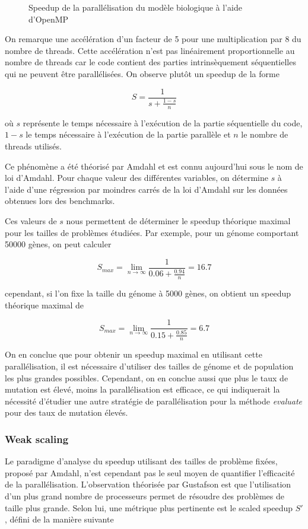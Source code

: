\documentclass[a4paper, 10pt, twoside]{article}
\begin{document}
\begin{figure}[htb]
\begin{minipage}{0.32\textwidth}
	\end{minipage}
	\caption{Speedup de la parallélisation du modèle biologique à l'aide d'OpenMP}
	\label{fig:speedup/omp}
\end{figure}

On remarque une accélération d'un facteur de 5 pour une multiplication par 8 du nombre de threads. Cette accélération n'est pas linéairement proportionnelle au nombre de threads car le code contient des parties intrinsèquement séquentielles qui ne peuvent être parallélisées. On observe plutôt un speedup de la forme

$$ S = \frac{1}{s + \frac{1-s}{n}} $$

où $s$ représente le temps nécessaire à l'exécution de la partie séquentielle du code, $1-s$ le temps nécessaire à l'exécution de la partie parallèle et $n$ le nombre de threads utilisés.

Ce phénomène a été théorisé par Amdahl \cite{amdahl2007validity} et est connu aujourd'hui sous le nom de loi d'Amdahl.
Pour chaque valeur des différentes variables, on détermine $s$ à l'aide d'une régression par moindres carrés de la loi d'Amdahl sur les données obtenues lors des benchmarks.

Ces valeurs de $s$ nous permettent de déterminer le speedup théorique maximal pour les tailles de problèmes étudiées. Par exemple, pour un génome comportant 50000 gènes, on peut calculer

$$ S_{max} = \lim_{n\to\infty} \frac{1}{0.06 + \frac{0.94}{n}} = 16.7 $$

cependant, si l'on fixe la taille du génome à 5000 gènes, on obtient un speedup théorique maximal de

$$ S_{max} = \lim_{n\to\infty} \frac{1}{0.15 + \frac{0.85}{n}} = 6.7 $$

On en conclue que pour obtenir un speedup maximal en utilisant cette parallélisation, il est nécessaire d'utiliser des tailles de génome et de population les plus grandes possibles. Cependant, on en conclue aussi que plus le taux de mutation est élevé, moins la parallélisation est efficace, ce qui indiquerait la nécessité d'étudier une autre stratégie de parallélisation pour la méthode \textit{evaluate} pour des taux de mutation élevés.

\subsubsection*{Weak scaling}

Le paradigme d'analyse du speedup utilisant des tailles de problème fixées, proposé par Amdahl, n'est cependant pas le seul moyen de quantifier l'efficacité de la parallélisation. L'observation théorisée par Gustafson \cite{gustafson} est que l'utilisation d'un plus grand nombre de processeurs permet de résoudre des problèmes de taille plus grande. Selon lui, une métrique plus pertinente est le scaled speedup $S'$, défini de la manière suivante
\end{document}
